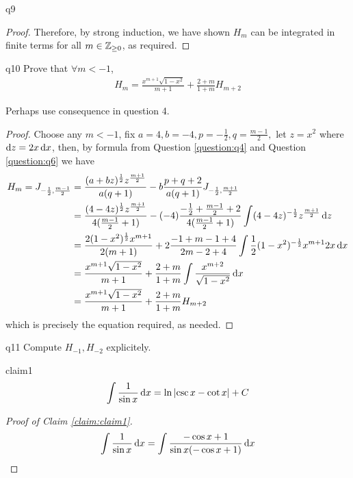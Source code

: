 \documentclass[reqno]{alittlebear}
\begin{document}
\begin{exercise}{}{}
\begin{question}{}{q9}
\begin{proof}
        Therefore, by strong induction, we have shown $H_m$ can be integrated in finite terms for all $m\in\mathbb{Z}_{\geq0}$, as required.
    \end{proof}
\end{question}
\newpage
\begin{question}{}{q10}
    Prove that $\forall m<-1$, \[\begin{aligned}H_m=\frac{x^{m+1}\sqrt{1-x^2}}{m+1}+\frac{2+m}{1+m}H_{m+2}\end{aligned}\]
    \qbreak
    \begin{hint}
        Perhaps use consequence in question 4.
    \end{hint}
    \begin{proof}
        Choose any $m<-1$, fix $a=4, b=-4, p=-\frac12, q=\frac{m-1}{2},$ let $z=x^2$ where $\mathop{}\!\mathrm{d} z=2x\mathop{}\!\mathrm{d} x$, then, by formula from Question \ref{question:q4} and Question \ref{question:q6} we have
        \begin{align*}
            H_m=J_{-\frac12, \frac{m-1}{2}}&=\frac{(a+bz)^{\frac12}z^{\frac{m+1}{2}}}{a(q+1)}-b\frac{p+q+2}{a(q+1)}J_{-\frac12,\frac{m+1}{2}}\\
            &=\frac{(4-4z)^{\frac12}z^{\frac{m+1}{2}}}{4(\frac{m-1}{2}+1)}-(-4)\frac{-\frac12+\frac{m-1}{2}+2}{4(\frac{m-1}{2}+1)}\int (4-4z)^{-\frac12}z^{\frac{m+1}{2}}\mathop{}\!\mathrm{d} z\\
            &=\frac{2(1-x^2)^{\frac12}x^{m+1}}{2(m+1)}+2\frac{-1+m-1+4}{2m-2+4}\int \frac12 (1-x^2)^{-\frac12}x^{m+1} 2x\mathop{}\!\mathrm{d} x\\
            &=\frac{x^{m+1}\sqrt{1-x^2}}{m+1}+\frac{2+m}{1+m}\int \frac{x^{m+2}}{\sqrt{1-x^2}}\mathop{}\!\mathrm{d} x\\
            &=\frac{x^{m+1}\sqrt{1-x^2}}{m+1}+\frac{2+m}{1+m} H_{m+2}\\
        \end{align*}
        which is precisely the equation required, as needed.
    \end{proof}
\end{question}
\newpage
\begin{question}{}{q11}
    Compute $H_{-1}, H_{-2}$ explicitely.
    \qbreak
    \begin{claim}{}{claim1}
        \[\int \frac{1}{\sin x}\mathop{}\!\mathrm{d} x = \ln\left|\csc x - \cot x\right| + C\]
        \qbreak
        \begin{proof}[Proof of Claim \ref{claim:claim1}]
            \begin{align*}
                \int\frac{1}{\sin x}\D x &= \int \frac{-\cos x + 1}{\sin x (-\cos x + 1)}\D x\\

\end{align*}
\end{proof}
\end{claim}
\end{question}
\end{exercise}
\end{document}
